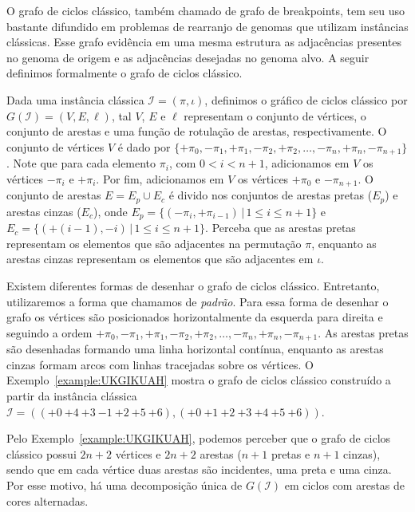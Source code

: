 O grafo de ciclos clássico, também chamado de grafo de breakpoints, tem seu uso bastante difundido em problemas de rearranjo de genomas que utilizam instâncias clássicas. Esse grafo evidência em uma mesma estrutura as adjacências presentes no genoma de origem e as adjacências desejadas no genoma alvo. A seguir definimos formalmente o grafo de ciclos clássico.

Dada uma instância clássica $\mathcal{I} = (\pi,\iota)$, definimos o gráfico de ciclos clássico por $G(\mathcal{I}) = (V, E, \ell)$, tal $V$, $E$ e $\ell$ representam o conjunto de vértices, o conjunto de arestas e uma função de rotulação de arestas, respectivamente. O conjunto de vértices $V$ é dado por $\{{+\pi_0}, {-\pi_1}, {+\pi_1}, {-\pi_2}, {+\pi_2}, \dots, {-\pi_n}, {+\pi_n}, {-\pi_{n+1}}\}$. Note que para cada elemento $\pi_i$, com $0 < i < n+1$, adicionamos em $V$ os vértices ${-\pi_i}$ e ${+\pi_i}$. Por fim, adicionamos em $V$ os vértices ${+\pi_0}$ e ${-\pi_{n+1}}$. O conjunto de arestas $E = E_p \cup E_c$ é divido nos conjuntos de arestas pretas ($E_p$) e arestas cinzas ($E_c$), onde $E_p = \{(-\pi_i, +\pi_{i-1}) \,|\, 1 \leq i \leq n+1\}$ e $E_c = \{(+(i-1), -i) \,|\, 1 \leq i \leq n + 1\}$. Perceba que as arestas pretas representam os elementos que são adjacentes na permutação $\pi$, enquanto as arestas cinzas representam os elementos que são adjacentes em $\iota$.

Existem diferentes formas de desenhar o grafo de ciclos clássico. Entretanto, utilizaremos a forma que chamamos de \emph{padrão}. Para essa forma de desenhar o grafo os vértices são posicionados horizontalmente da esquerda para direita e seguindo a ordem ${+\pi_0}, {-\pi_1}, {+\pi_1}, {-\pi_2}, {+\pi_2}, \dots, {-\pi_n}, {+\pi_n}, {-\pi_{n+1}}$. As arestas pretas são desenhadas formando uma linha horizontal contínua, enquanto as arestas cinzas formam arcos com linhas tracejadas sobre os vértices. O Exemplo~\ref{example:UKGIKUAH} mostra o grafo de ciclos clássico construído a partir da instância clássica $\mathcal{I} = (({+0}~{+4}~{+3}~{-1}~{+2}~{+5}~{+6}),({+0}~{+1}~{+2}~{+3}~{+4}~{+5}~{+6}))$.



Pelo Exemplo~\ref{example:UKGIKUAH}, podemos perceber que o grafo de ciclos clássico possui $2n+2$ vértices e $2n+2$ arestas ($n+1$ pretas e $n+1$ cinzas), sendo que em cada vértice duas arestas são incidentes, uma preta e uma cinza. Por esse motivo, há uma decomposição única de $G(\mathcal{I})$ em ciclos com arestas de cores alternadas. 

